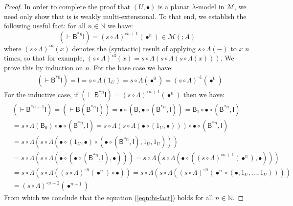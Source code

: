 \documentclass{llncs}
\begin{document}
\begin{proof}
In order to complete the proof that $(U,\bullet)$ is a planar $\lambda$-model in $\mathcal{M}$, we need only show that is is weakly multi-extensional. To that end, we establish the following useful fact: for all $n \in \mathbb{N}$ we have: 
  \begin{equation}\label{eqn:bi-fact}
    (\vdash \mathsf{B}^{*n}\mathsf{I}) = (s \circ \Lambda)^{\circ n+1}(\bullet^n) \in \mathcal{M}(;A)
  \end{equation}
  where $(s \circ \Lambda)^{\circ n}(x)$ denotes the (syntactic) result of applying $s \circ \Lambda(-)$ to $x$ $n$ times, so that for example, $(s \circ \Lambda)^{\circ 3}(x) = s \circ \Lambda(s \circ \Lambda(s \circ \Lambda(x)))$. We prove this by induction on $n$. For the base case we have:
  \begin{align*}
    & (\vdash \mathsf{B}^{*0}\mathsf{I})
      = \mathsf{I}
      = s \circ \Lambda(1_U)
      = s \circ \Lambda(\bullet^0)
      = (s \circ \Lambda)^{\circ 1}(\bullet^0)
  \end{align*}
For the inductive case, if  $(\vdash \mathsf{B}^{*n}\mathsf{I}) = (s \circ \Lambda)^{\circ n+1}(\bullet^n)$ then we have:
\begin{align*}
  & (\vdash \mathsf{B}^{*n+1}\mathsf{I})
    = (\vdash \mathsf{B}(\mathsf{B}^{*n}\mathsf{I}))
    = \bullet \circ (\mathsf{B},\bullet \circ (\mathsf{B}^{*n},\mathsf{I}))
    = \mathsf{B}_1 \circ \bullet \circ (\mathsf{B}^{*n},\mathsf{I})
  \\&= s \circ \Lambda(\mathsf{B}_0) \circ \bullet \circ (\mathsf{B}^{*n},\mathsf{I})
  = s \circ \Lambda(s \circ \Lambda(\bullet \circ (1_U,\bullet))) \circ \bullet \circ (\mathsf{B}^{*n},\mathsf{I})
  \\&= s \circ \Lambda(s \circ \Lambda(\bullet \circ (1_U,\bullet) \circ (\bullet \circ (\mathsf{B}^{*n},\mathsf{I}),1_U,1_U)))
  \\&= s \circ \Lambda(s \circ \Lambda(\bullet \circ (\bullet \circ (\mathsf{B}^{*n},\mathsf{I}),\bullet)))
  = s \circ \Lambda(s \circ \Lambda(\bullet \circ ((s \circ \Lambda)^{\circ n+1}(\bullet^n),\bullet)))
  \\&= s \circ \Lambda(s \circ \Lambda((s \circ \Lambda)^{\circ n}(\bullet^n) \circ \bullet))
  = s \circ \Lambda(s \circ \Lambda((s \circ \Lambda)^{\circ n}(\bullet^n \circ (\bullet,1_U,\ldots,1_U))))
  \\&= (s \circ \Lambda)^{\circ n+2}(\bullet^{n+1})
\end{align*}
From which we conclude that the equation (\ref{eqn:bi-fact}) holds for all $n \in \mathbb{N}$.


\end{proof}
\end{document}
